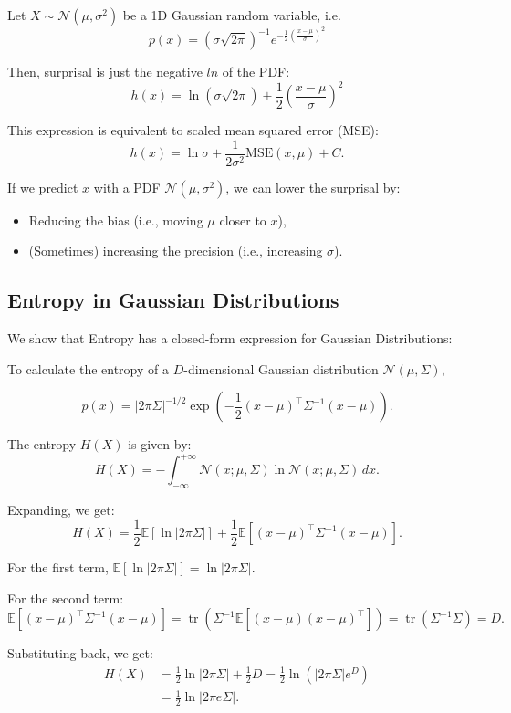 Let \( X \sim \mathcal{N}(\mu, \sigma^2) \) be a 1D Gaussian random variable, i.e.
\[
    p(x) = \left( \sigma \sqrt{2 \pi} \right)^{-1} e^{-\frac{1}{2} \left( \frac{x - \mu}{\sigma} \right)^2}
\]


Then, surprisal is just the negative $ln$ of the PDF:
\[
    h(x) = \ln \left( \sigma \sqrt{2 \pi} \right) + \frac{1}{2} \left( \frac{x - \mu}{\sigma} \right)^2
\]

This expression is equivalent to scaled mean squared error (MSE):
\[
    h(x) = \ln \sigma + \frac{1}{2 \sigma^2} \text{MSE}(x, \mu) + C.
\]

If we predict \( x \) with a PDF \( \mathcal{N}(\mu, \sigma^2) \), we can lower the surprisal by:

\begin{itemize}
    \item Reducing the bias (i.e., moving \( \mu \) closer to \( x \)),
    \item (Sometimes) increasing the precision (i.e., increasing \( \sigma \)).
\end{itemize}


\subsection{Entropy in Gaussian Distributions}

We show that Entropy has a closed-form expression for Gaussian Distributions:

To calculate the entropy of a \(D\)-dimensional Gaussian distribution \(\mathcal{N}(\mu, \Sigma)\),

\[
    p(x) = |2 \pi \Sigma|^{-1/2} \exp \left( -\frac{1}{2} (x - \mu)^\top \Sigma^{-1} (x - \mu) \right).
\]

The entropy \(H(X)\) is given by:
\[
    H(X) = - \int_{-\infty}^{+\infty} \mathcal{N}(x; \mu, \Sigma) \ln \mathcal{N}(x; \mu, \Sigma) \, dx.
\]

Expanding, we get:
\[
    H(X) = \frac{1}{2} \mathbb{E}[\ln |2 \pi \Sigma|] + \frac{1}{2} \mathbb{E}[(x - \mu)^\top \Sigma^{-1} (x - \mu)].
\]

For the first term, \(\mathbb{E}[\ln |2 \pi \Sigma|] = \ln |2 \pi \Sigma|\).

For the second term:
\[
    \mathbb{E} \left[ (x - \mu)^\top \Sigma^{-1} (x - \mu) \right] = \operatorname{tr} \left( \Sigma^{-1} \mathbb{E} \left[ (x - \mu)(x - \mu)^\top \right] \right) = \operatorname{tr}(\Sigma^{-1} \Sigma) = D.
\]

Substituting back, we get:
\begin{align*}
    H(X) &= \frac{1}{2} \ln |2 \pi \Sigma| + \frac{1}{2} D = \frac{1}{2} \ln \left( |2 \pi \Sigma| e^D \right)\\ &= \frac{1}{2} \ln |2 \pi e \Sigma|.
\end{align*}




